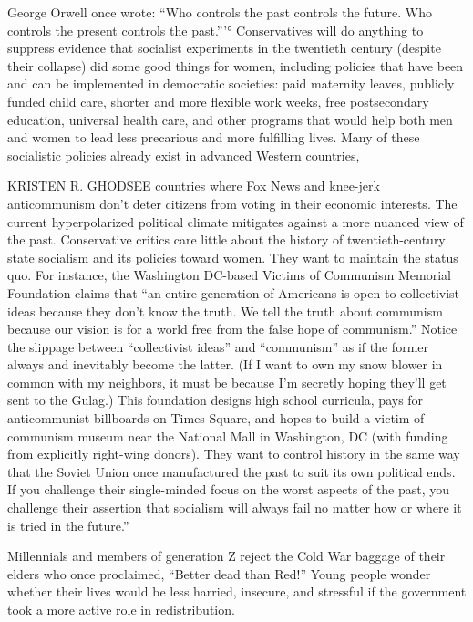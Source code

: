  \par 
George Orwell once wrote: “Who controls the past controls the future. Who controls the present controls the past.”’° Conservatives will do anything to suppress evidence that socialist experiments in the twentieth century (despite their collapse) did some good things for women, including policies that have been and can be implemented in democratic societies: paid maternity leaves, publicly funded child care, shorter and more flexible work weeks, free postsecondary education, universal health care, and other programs that would help both men and women to lead less precarious and more fulfilling lives. Many of these socialistic policies already exist in advanced Western countries,
 \par 
KRISTEN R. GHODSEE countries where Fox News and knee-jerk anticommunism don’t deter citizens from voting in their economic interests. The current hyperpolarized political climate mitigates against a more nuanced view of the past. Conservative critics care little about the history of twentieth-century state socialism and its policies toward women. They want to maintain the status quo. For instance, the Washington DC-based Victims of Communism Memorial Foundation claims that “an entire generation of Americans is open to collectivist ideas because they don’t know the truth. We tell the truth about communism because our vision is for a world free from the false hope of communism.” Notice the slippage between “collectivist ideas” and “communism” as if the former always and inevitably become the latter. (If I want to own my snow blower in common with my neighbors, it must be because I’m secretly hoping they'll get sent to the Gulag.) This foundation designs high school curricula, pays for anticommunist billboards on Times Square, and hopes to build a victim of communism museum near the National Mall in Washington, DC (with funding from explicitly right-wing donors). They want to control history in the same way that the Soviet Union once manufactured the past to suit its own political ends. If you challenge their single-minded focus on the worst aspects of the past, you challenge their assertion that socialism will always fail no matter how or where it is tried in the future.”
 \par 
Millennials and members of generation Z reject the Cold War baggage of their elders who once proclaimed, “Better dead than Red!” Young people wonder whether their lives would be less harried, insecure, and stressful if the government took a more active role in redistribution.
